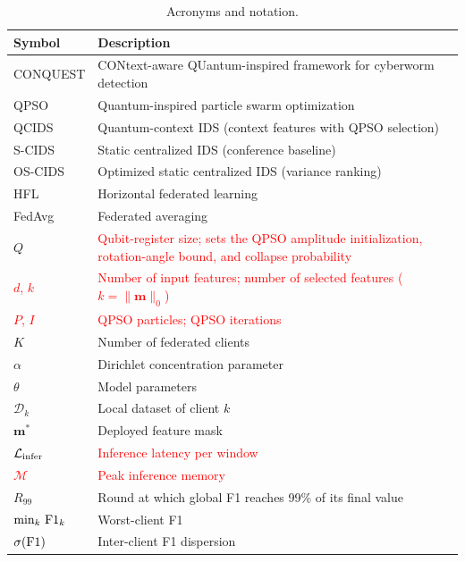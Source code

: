 \documentclass[conference]{IEEEtran}
\begin{document}
\begin{table}[!t]
\centering
\scriptsize
\caption{Acronyms and notation.}
\label{tab:acronyms_notations}
\setlength{\tabcolsep}{4pt}
\renewcommand{\arraystretch}{1.05}
\begin{tabular}{p{1.8cm} p{5.2cm}}
\hline\toprule
\textbf{Symbol} & \textbf{Description} \\
\hline\toprule
CONQUEST  & CONtext-aware QUantum-inspired framework for cyberworm detection \\
QPSO      & Quantum-inspired particle swarm optimization \\
QCIDS     & Quantum-context IDS (context features with QPSO selection) \\
S-CIDS    & Static centralized IDS (conference baseline) \\
OS-CIDS   & Optimized static centralized IDS (variance ranking) \\
HFL       & Horizontal federated learning \\
FedAvg    & Federated averaging \\
\midrule
$Q$                     & \textcolor{red}{Qubit-register size; sets the
                          QPSO amplitude initialization, rotation-angle
                          bound, and collapse probability} \\
\textcolor{red}{$d$, $k$} & \textcolor{red}{Number of input features; number
                          of selected features ($k=\|\mathbf{m}\|_0$)} \\
\textcolor{red}{$P$, $I$} & \textcolor{red}{QPSO particles; QPSO iterations} \\
$K$                     & Number of federated clients \\
$\alpha$                & Dirichlet concentration parameter \\
$\theta$                & Model parameters \\
$\mathcal{D}_k$         & Local dataset of client $k$ \\
$\mathbf{m}^{*}$        & Deployed feature mask \\
\textcolor{red}{$\mathcal{L}_{\rm infer}$} & \textcolor{red}{Inference latency per window} \\
\textcolor{red}{$\mathcal{M}$} & \textcolor{red}{Peak inference memory} \\
$R_{99}$                & Round at which global F1 reaches 99\% of its final value \\
$\min_k\,{\rm F1}_k$    & Worst-client F1 \\
$\sigma({\rm F1})$      & Inter-client F1 dispersion \\
\hline\toprule
\end{tabular}
\end{table}
\end{document}
